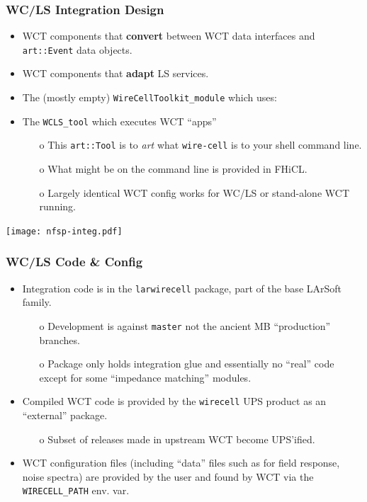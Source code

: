 \documentclass[xcolor=dvipsnames]{beamer}
\begin{document}
\begin{frame}
  \frametitle{WC/LS Integration Design}

  \begin{itemize}\footnotesize
  \item WCT components that \textbf{convert} between WCT data
    interfaces and \texttt{art::Event} data objects.
  \item WCT components that \textbf{adapt} LS services.
  \item The (mostly empty) \texttt{WireCellToolkit\_module} which uses:
  \item The \texttt{WCLS\_tool}  which executes WCT ``apps''
    \begin{itemize}\scriptsize
    \item[o] This \texttt{art::Tool} is to \textit{art} what
      \texttt{wire-cell} is to your shell command line.
    \item[o] What might be on the command line is provided in FHiCL.
    \item[o] Largely identical WCT config works for WC/LS or stand-alone WCT running.
    \end{itemize}
  \end{itemize}

  \begin{center}
    \texttt{[image: nfsp-integ.pdf]}
  \end{center}

\end{frame}

\begin{frame}
  \frametitle{WC/LS Code \& Config}

  \begin{itemize}
  \item Integration code is in the \texttt{larwirecell} package, part
    of the base LArSoft family.
    \begin{itemize}\scriptsize
    \item[o] Development is against \texttt{master} not the ancient MB
      ``production'' branches.
    \item[o] Package only holds integration glue and essentially no
      ``real'' code except for some ``impedance matching'' modules.
    \end{itemize}
  \item Compiled WCT code is provided by the \texttt{wirecell} UPS
    product as an ``external'' package.
    \begin{itemize}\scriptsize
    \item[o] Subset of releases made in upstream WCT become UPS'ified.
    \end{itemize}
  \item WCT configuration files (including ``data'' files such as for
    field response, noise spectra) are provided by the user and found
    by WCT via the \texttt{WIRECELL\_PATH} env. var.
  \end{itemize}
\end{frame}
\end{document}
